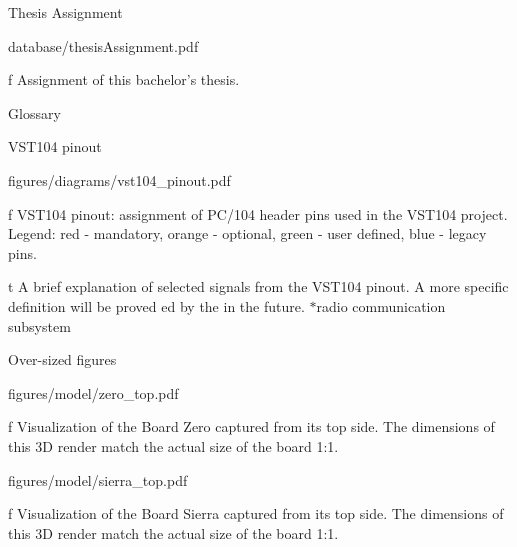 

\app Thesis Assignment

\midinsert
    \hsize \cinspic database/thesisAssignment.pdf
    \caption/f Assignment of this bachelor's thesis.
\endinsert




\app Glossary
\makeglos




\app VST104 pinout

\midinsert
    \hsize \cinspic figures/diagrams/vst104_pinout.pdf
    \caption/f VST104 pinout: assignment of PC/104 header pins used in the VST104 project. Legend: red - mandatory, orange - optional, green - user defined, blue - legacy pins.
\endinsert

\midinsert {}
    \caption/t A brief explanation of selected signals from the VST104 pinout. A more specific definition will be proved ed by the  in the future. $*$radio communication subsystem
\endinsert




\app Over-sized figures

\midinsert
    \picw=90.17mm \cinspic figures/model/zero_top.pdf
    \caption/f Visualization of the Board Zero captured from its top side. The dimensions of this 3D render match the actual size of the board 1:1.
\endinsert

\midinsert
    \picw=90.17mm \cinspic figures/model/sierra_top.pdf
    \caption/f Visualization of the Board Sierra captured from its top side. The dimensions of this 3D render match the actual size of the board 1:1.
\endinsert

